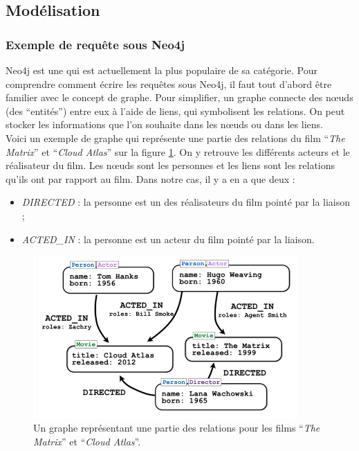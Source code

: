 \subsection{Modélisation}

	\subsubsection{Exemple de requête sous Neo4j}
	Neo4j est une \bddGraphe{} qui est actuellement la plus populaire de sa catégorie. Pour comprendre comment écrire les requêtes sous Neo4j, il faut tout d'abord être familier avec le concept de graphe. Pour simplifier, un graphe connecte des nœuds (des \enquote{entités}) entre eux à l'aide de liens, qui symbolisent les relations. On peut stocker les informations que l'on souhaite dans les nœuds ou dans les liens.\\

	Voici un exemple de graphe qui représente une partie des relations du film \enquote{\textit{The Matrix}} et \enquote{\textit{Cloud Atlas}} sur la figure \ref{grapheNeo4j}. On y retrouve les différents acteurs et le réalisateur du film. Les nœuds sont les personnes et les liens sont les relations qu'ils ont par rapport au film. Dans notre cas, il y a en a que deux :
	\vspace{5px}
	\begin{itemize}
		\item \textit{DIRECTED} : la personne est un des réalisateurs du film pointé par la liaison ; 
		\item \textit{ACTED\_IN} : la personne est un acteur du film pointé par la liaison. 
	\end{itemize}

	\begin{figure}[H]
		\centering
		\includegraphics[width=0.9\textwidth]{images/graphe.png}
		\caption{Un graphe représentant une partie des relations pour les films \enquote{\textit{The Matrix}} et \enquote{\textit{Cloud Atlas}}.\cite{grapheNeo4j}}
		\label{grapheNeo4j}
	\end{figure}


